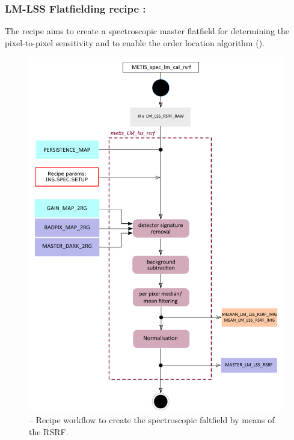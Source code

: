 \subsubsection{LM-LSS Flatfielding recipe :}\label{rec:lsslmrsrf}
The recipe \hyperref[rec:lsslmrsrf]{} aims to create a spectroscopic master flatfield for determining the pixel-to-pixel sensitivity and to enable the order location algorithm (\hyperref[rec:lsslmtrace]{}).
\begin{figure}[ht]
  \centering
  \includegraphics[width=0.5\textheight]{figures/metis_lm_lss_rsrf_v0.74.pdf}
  \caption[Recipe: ]{ --
    Recipe workflow to create the spectroscopic faltfield by means of the \ac{RSRF}.}
  \label{Fig:rec_lm_lss_rsrf}
\end{figure}

